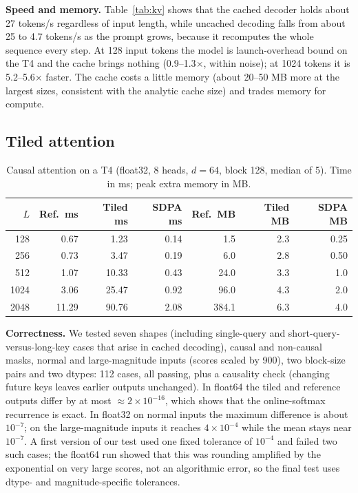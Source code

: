 \documentclass[conference]{IEEEtran}
\begin{document}
\textbf{Speed and memory.} Table~\ref{tab:kv} shows that the cached decoder holds about 27 tokens/s regardless of input length, while uncached decoding falls from about 25 to 4.7 tokens/s as the prompt grows, because it recomputes the whole sequence every step. At 128 input tokens the model is launch-overhead bound on the T4 and the cache brings nothing (0.9--1.3$\times$, within noise); at 1024 tokens it is 5.2--5.6$\times$ faster. The cache costs a little memory (about 20--50 MB more at the largest sizes, consistent with the analytic cache size) and trades memory for compute.

\subsection{Tiled attention}
\begin{table}[t]
\centering\footnotesize
\caption{Causal attention on a T4 (float32, 8 heads, $d=64$, block 128, median of 5). Time in ms; peak extra memory in MB.}
\label{tab:attn}
\begin{tabular}{rrrrrrr}\toprule
$L$ & Ref.\ ms & Tiled ms & SDPA ms & Ref.\ MB & Tiled MB & SDPA MB\\\midrule
128 & 0.67 & 1.23 & 0.14 & 1.5 & 2.3 & 0.25\\
256 & 0.73 & 3.47 & 0.19 & 6.0 & 2.8 & 0.50\\
512 & 1.07 & 10.33 & 0.43 & 24.0 & 3.3 & 1.0\\
1024 & 3.06 & 25.47 & 0.92 & 96.0 & 4.3 & 2.0\\
2048 & 11.29 & 90.76 & 2.08 & 384.1 & 6.3 & 4.0\\\bottomrule
\end{tabular}
\end{table}
\textbf{Correctness.} We tested seven shapes (including single-query and short-query-versus-long-key cases that arise in cached decoding), causal and non-causal masks, normal and large-magnitude inputs (scores scaled by 900), two block-size pairs and two dtypes: 112 cases, all passing, plus a causality check (changing future keys leaves earlier outputs unchanged). In float64 the tiled and reference outputs differ by at most $\approx2\times10^{-16}$, which shows that the online-softmax recurrence is exact. In float32 on normal inputs the maximum difference is about $10^{-7}$; on the large-magnitude inputs it reaches $4\times10^{-4}$ while the mean stays near $10^{-7}$. A first version of our test used one fixed tolerance of $10^{-4}$ and failed two such cases; the float64 run showed that this was rounding amplified by the exponential on very large scores, not an algorithmic error, so the final test uses dtype- and magnitude-specific tolerances.
\end{document}
